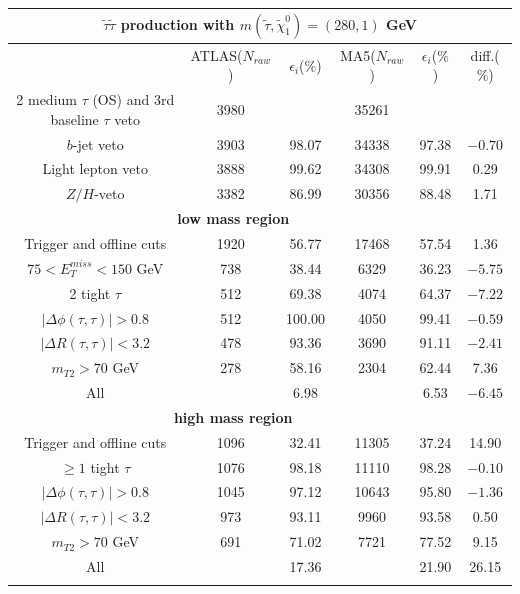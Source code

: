 \documentclass{ws-mpla}
\begin{document}
\begin{table}[h!]
  {\begin{tabular}{@{}c c c c c c@{}} \toprule
\hline
\multicolumn{6}{c}{ \textbf{$ \tilde{\tau}\tilde{\tau} $ production with $ m(\tilde{\tau},\tilde{\chi}^0_1) = (280,1) $ GeV} }\\
\hline\hline
 & ATLAS($N_{raw}$) & $\epsilon_i$($\%$) & MA5($N_{raw}$) & $\epsilon_i$($\%$) & diff.($\%$) \\
\hline\hline

2 medium $\tau$ (OS) and 3rd baseline $\tau$ veto & 3980 & & 35261 & & \\ \hline
$b$-jet veto & 3903 & 98.07 & 34338 & 97.38 & $-0.70$ \\ \hline
Light lepton veto & 3888 & 99.62 & 34308 & 99.91 & 0.29 \\ \hline
$Z/H$-veto & 3382 & 86.99 & 30356 & 88.48 & 1.71 \\ \hline
%
\multicolumn{5}{c}{ \textbf{low mass region} }\\\hline
%
Trigger and offline cuts & 1920 & 56.77 & 17468 & 57.54 & 1.36 \\ \hline
$ 75 < E^{miss}_T < 150 $ GeV & 738 & 38.44 & 6329 & 36.23 & $-5.75$ \\ \hline
2 tight $\tau$ & 512 & 69.38 & 4074 & 64.37 & $-7.22$ \\ \hline
$ |\Delta\phi(\tau,\tau)| > 0.8 $ & 512 & 100.00 & 4050 & 99.41 & $-0.59$ \\ \hline
$ |\Delta R(\tau,\tau)| < 3.2 $ & 478 & 93.36 & 3690 & 91.11 & $-2.41$ \\ \hline
$ m_{T2} > 70 $ GeV & 278 & 58.16 & 2304 & 62.44 & 7.36 \\ \hline
All &  & 6.98 &  & 6.53 & $-6.45$ \\ \hline
%
\hline
\multicolumn{5}{c}{ \textbf{high mass region} }\\\hline
%
Trigger and offline cuts & 1096 & 32.41 & 11305 & 37.24 & 14.90 \\ \hline
$ \geq 1 $ tight $\tau$ & 1076 & 98.18 & 11110 & 98.28 & $-0.10$ \\ \hline
$ |\Delta\phi(\tau,\tau)| > 0.8 $ & 1045 & 97.12 & 10643 & 95.80 & $-1.36$ \\ \hline
$ |\Delta R(\tau,\tau)| < 3.2 $ & 973 & 93.11 & 9960 & 93.58 & 0.50 \\ \hline
$ m_{T2} > 70 $ GeV & 691 & 71.02 & 7721 & 77.52 & 9.15 \\ \hline
All &  & 17.36 &  & 21.90 & 26.15 \\ \botrule
\end{tabular}
\label{tab:280GeV} }
\end{table} 
\end{document}
